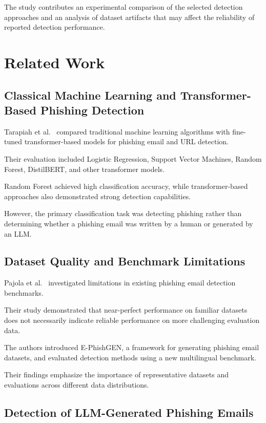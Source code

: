 \documentclass[sigconf,nonacm]{acmart}
\begin{document}
The study contributes an experimental comparison of
the selected detection approaches and an analysis
of dataset artifacts that may affect the reliability
of reported detection performance.


\section{Related Work}

\subsection{Classical Machine Learning and
Transformer-Based Phishing Detection}

Tarapiah et al.~\cite{tarapiah2025} compared
traditional machine learning algorithms with
fine-tuned transformer-based models for phishing
email and URL detection.

Their evaluation included Logistic Regression,
Support Vector Machines, Random Forest,
DistilBERT, and other transformer models.

Random Forest achieved high classification
accuracy, while transformer-based approaches
also demonstrated strong detection capabilities.

However, the primary classification task was
detecting phishing rather than determining
whether a phishing email was written by a
human or generated by an LLM.

\subsection{Dataset Quality and Benchmark Limitations}

Pajola et al.~\cite{pajola2025} investigated
limitations in existing phishing email
detection benchmarks.

Their study demonstrated that near-perfect
performance on familiar datasets does not
necessarily indicate reliable performance
on more challenging evaluation data.

The authors introduced E-PhishGEN, a framework
for generating phishing email datasets,
and evaluated detection methods using a
new multilingual benchmark.

Their findings emphasize the importance of
representative datasets and evaluations
across different data distributions.

\subsection{Detection of LLM-Generated
Phishing Emails}
\end{document}
